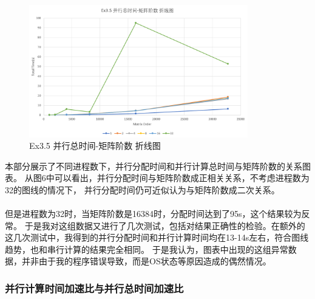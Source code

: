 \documentclass[UTF8]{article}
\begin{document}
    \begin{figure}[h]
        \centering
        \includegraphics[width=0.85\textwidth]{35ptto.png}
        \caption{Ex3.5 并行总时间-矩阵阶数 折线图}
    \end{figure}
    本部分展示了不同进程数下，并行分配时间和并行计算总时间与矩阵阶数的关系图表。
    从图6中可以看出，并行分配时间与矩阵阶数成正相关关系，不考虑进程数为32的图线的情况下，
    并行分配时间仍可近似认为与矩阵阶数成二次关系。\\\\

    但是进程数为32时，当矩阵阶数是16384时，分配时间达到了95s，这个结果较为反常。
    于是我对这组数据又进行了几次测试，包括对结果正确性的检验。在额外的这几次测试中，我得到的并行分配时间和并行计算时间均在13-14s左右，符合图线趋势，也和串行计算的结果完全相同。
    于是我认为，图表中出现的这组异常数据，并非由于我的程序错误导致，而是OS状态等原因造成的偶然情况。

\clearpage
\subsubsection{并行计算时间加速比与并行总时间加速比}
\end{document}
